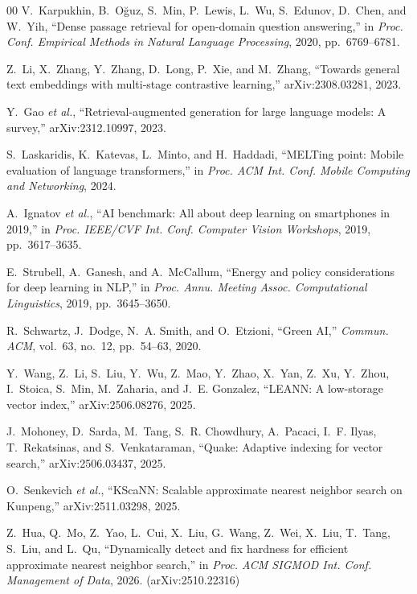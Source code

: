 \documentclass[journal]{IEEEtran}
\begin{document}
\begin{thebibliography}{00}
V.~Karpukhin, B.~O\u{g}uz, S.~Min, P.~Lewis, L.~Wu, S.~Edunov, D.~Chen, and
W.~Yih, ``Dense passage retrieval for open-domain question answering,'' in
\emph{Proc. Conf. Empirical Methods in Natural Language Processing}, 2020,
pp.~6769--6781.

Z.~Li, X.~Zhang, Y.~Zhang, D.~Long, P.~Xie, and M.~Zhang, ``Towards general
text embeddings with multi-stage contrastive learning,'' arXiv:2308.03281,
2023.

Y.~Gao \emph{et al.}, ``Retrieval-augmented generation for large language
models: A survey,'' arXiv:2312.10997, 2023.

S.~Laskaridis, K.~Katevas, L.~Minto, and H.~Haddadi, ``MELTing point: Mobile
evaluation of language transformers,'' in \emph{Proc. ACM Int. Conf. Mobile
Computing and Networking}, 2024.

A.~Ignatov \emph{et al.}, ``AI benchmark: All about deep learning on
smartphones in 2019,'' in \emph{Proc. IEEE/CVF Int. Conf. Computer Vision
Workshops}, 2019, pp.~3617--3635.

E.~Strubell, A.~Ganesh, and A.~McCallum, ``Energy and policy considerations
for deep learning in NLP,'' in \emph{Proc. Annu. Meeting Assoc. Computational
Linguistics}, 2019, pp.~3645--3650.

R.~Schwartz, J.~Dodge, N.~A. Smith, and O.~Etzioni, ``Green AI,''
\emph{Commun. ACM}, vol.~63, no.~12, pp.~54--63, 2020.

Y.~Wang, Z.~Li, S.~Liu, Y.~Wu, Z.~Mao, Y.~Zhao, X.~Yan, Z.~Xu, Y.~Zhou,
I.~Stoica, S.~Min, M.~Zaharia, and J.~E. Gonzalez, ``LEANN: A low-storage
vector index,'' arXiv:2506.08276, 2025.

J.~Mohoney, D.~Sarda, M.~Tang, S.~R. Chowdhury, A.~Pacaci, I.~F. Ilyas,
T.~Rekatsinas, and S.~Venkataraman, ``Quake: Adaptive indexing for vector
search,'' arXiv:2506.03437, 2025.

O.~Senkevich \emph{et al.}, ``KScaNN: Scalable approximate nearest neighbor
search on Kunpeng,'' arXiv:2511.03298, 2025.

Z.~Hua, Q.~Mo, Z.~Yao, L.~Cui, X.~Liu, G.~Wang, Z.~Wei, X.~Liu, T.~Tang,
S.~Liu, and L.~Qu, ``Dynamically detect and fix hardness for efficient
approximate nearest neighbor search,'' in \emph{Proc. ACM SIGMOD Int. Conf.
Management of Data}, 2026. (arXiv:2510.22316)


\end{thebibliography}
\end{document}
